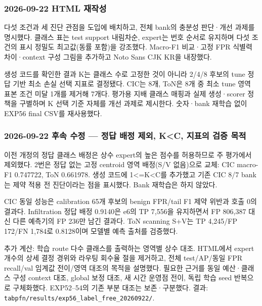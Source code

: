 \subsubsection{2026-09-22 HTML 재작성}
다섯 조건과 세 진단 관점을 도입에 배치하고, 전체 bank의 충분성 판단·개선 과제를 명시했다. 클래스 표는 test support 내림차순, expert는 번호 순서로 유지하며 다섯 조건의 표시 정밀도 최고값(동률 포함)을 강조했다. Macro-F1 비교·고정 FPR 식별력 차이·context 구성 그림을 추가하고 Noto Sans CJK KR을 내장했다.

생성 코드를 확인한 결과 K는 클래스 수로 고정한 것이 아니라 2/\allowbreak{}4/\allowbreak{}8 후보의 tune 정답 기반 최소 손실 선택 지표로 결정됐다. CIC는 8개, ToN은 8개 중 최소 tune 영역 표본 조건 미달 1개를 제거해 7개다. 평가용 지배 클래스 매핑과 실제 생성·scorer 정책을 구별하며 K 선택 기준 자체를 개선 과제로 제시한다. 숫자·bank 재학습 없이 EXP56 final CSV를 재사용했다.

\subsubsection{2026-09-22 후속 수정 — 정답 배정 제외, K<C, 지표의 검증 목적}
이전 개정의 정답 클래스 배정은 상수 expert의 높은 점수를 허용하므로 주 평가에서 제외했다. 2번은 정답 없는 고정 centroid 영역 배정(S/\allowbreak{}V 없음)으로 교체: CIC macro-F1 0.747722, ToN 0.661978. 생성 코드에 1<=\allowbreak{}K<C를 추가했고 기존 CIC 8/\allowbreak{}7 bank는 제약 적용 전 진단이라는 점을 표시했다. Bank 재학습은 하지 않았다.

CIC 동일 성능은 calibration 65개 후보의 benign FPR/\allowbreak{}tail F1 제약 위반과 호출 0의 결과다. Infiltration 정답 배정 0.9140은 e6의 TP 7,556을 유지하면서 FP 806,387 대신 다른 예측기의 FP 236만 남긴 결과다. ToN scanning S+\allowbreak{}V는 TP 4,245/\allowbreak{}FP 172/\allowbreak{}FN 1,784로 0.8128이며 모델별 예측 출처를 검증했다.

추가 계산: 학습 route 다수 클래스를 출력하는 영역별 상수 대조. HTML에서 expert 개수의 상세 결정 경위와 라우팅 회수율 절을 제거하고, 전체 test/\allowbreak{}AP/\allowbreak{}동일 FPR recall/\allowbreak{}val 임계값 전이/\allowbreak{}영역 대조의 목적을 설명했다. 필요한 근거를 동일 예산·클래스 구성 context 대조, global 보정 대조, 새 시간 운영점 전이, 독립 학습 seed 반복으로 구체화했다. EXP52–54의 기존 부분 대조는 보존·구분했다. 결과: \texttt{tabpfn/\allowbreak{}\allowbreak{}r\allowbreak{}esults/\allowbreak{}\allowbreak{}e\allowbreak{}xp56\_\allowbreak{}\allowbreak{}lab\allowbreak{}el\_\allowbreak{}\allowbreak{}free\_\allowbreak{}\allowbreak{}20260922\allowbreak{}/\allowbreak{}\allowbreak{}}.

